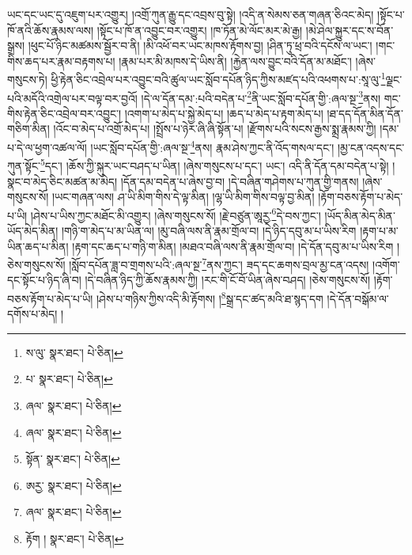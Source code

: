 ཡང་དང་ཡང་དུ་འཇུག་པར་འགྱུར། །འགྲོ་ཀུན་རྒྱུ་དང་འབྲས་བུ་སྟེ། །འདི་ན་སེམས་ཅན་གཞན་ཅིའང་མེད། །སྟོང་པ་ཁོ་ནའི་ཆོས་རྣམས་ལས། །སྟོང་པ་ཁོ་ན་འབྱུང་བར་འགྱུར། །ཁ་ཏོན་མེ་ལོང་མར་མེ་རྒྱ། །མེ་ཤེལ་སྐྱུར་དང་ས་བོན་སྒྲས། །ཕུང་པོ་ཉིང་མཚམས་སྦྱོར་བ་ནི། །མི་འཕོ་བར་ཡང་མཁས་རྟོགས་བྱ། །ཤིན་ཏུ་ཕྲ་བའི་དངོས་ལ་ཡང་། །གང་གིས་ཆད་པར་རྣམ་བརྟགས་པ། །རྣམ་པར་མི་མཁས་དེ་ཡིས་ནི། །རྐྱེན་ལས་བྱུང་བའི་དོན་མ་མཐོང་། །ཞེས་གསུངས་ཏེ། ཕྱི་རྟེན་ཅིང་འབྲེལ་པར་འབྱུང་བའི་ཚུལ་ཡང་སློབ་དཔོན་ཉིད་ཀྱིས་མཛད་པའི་འཕགས་པ་:སཱ་ལུ་\footnote{ས་ལུ་  སྣར་ཐང་།  པེ་ཅིན། }ལྗང་པའི་མདོའི་འགྲེལ་པར་བལྟ་བར་བྱའོ། །དེ་ལ་དོན་དམ་:པའི་བདེན་པ་\footnote{པ་  སྣར་ཐང་།  པེ་ཅིན། }ནི་ཡང་སློབ་དཔོན་གྱི་:ཞལ་སྔ་\footnote{ཞལ་  སྣར་ཐང་།  པེ་ཅིན། }ནས། གང་གིས་རྟེན་ཅིང་འབྲེལ་བར་འབྱུང་། །འགག་པ་མེད་པ་སྐྱེ་མེད་པ། །ཆད་པ་མེད་པ་རྟག་མེད་པ། །ཐ་དད་དོན་མིན་དོན་གཅིག་མིན། །འོང་བ་མེད་པ་འགྲོ་མེད་པ། །སྤྲོས་པ་ཉེར་ཞི་ཞི་སྟོན་པ། །རྫོགས་པའི་སངས་རྒྱས་སྨྲ་རྣམས་ཀྱི། །དམ་པ་དེ་ལ་ཕྱག་འཚལ་ལོ། །ཡང་སློབ་དཔོན་གྱི་:ཞལ་སྔ་\footnote{ཞལ་  སྣར་ཐང་།  པེ་ཅིན། }ནས། རྣམ་ཤེས་ཀྱང་ནི་འོད་གསལ་དང་། །མྱ་ངན་འདས་དང་ཀུན་སྟོང་\footnote{སྟོན་  སྣར་ཐང་།  པེ་ཅིན། }དང་། །ཆོས་ཀྱི་སྐུར་ཡང་བཤད་པ་ཡིན། །ཞེས་གསུངས་པ་དང་། ཡང་། འདི་ནི་དོན་དམ་བདེན་པ་སྟེ། །སྣང་བ་མེད་ཅིང་མཚན་མ་མེད། །དོན་དམ་བདེན་པ་ཞེས་བྱ་བ། །དེ་བཞིན་གཤེགས་པ་ཀུན་གྱི་གནས། །ཞེས་གསུངས་སོ། །ཡང་གཞན་ལས། ཤ་ཡི་མིག་གིས་དེ་ལྟ་མིན། །ལྷ་ཡི་མིག་གིས་བལྟ་བྱ་མིན། །རྟོག་བཅས་རྟོག་པ་མེད་པ་ཡི། །ཤེས་པ་ཡིས་ཀྱང་མཐོང་མི་འགྱུར། །ཞེས་གསུངས་སོ། །རྗེ་བཙུན་ཨཱརྱ་\footnote{ཨརྱ་  སྣར་ཐང་།  པེ་ཅིན། }དེ་བས་ཀྱང་། །ཡོད་མིན་མེད་མིན་ཡོད་མེད་མིན། །གཉི་ག་མེད་པ་མ་ཡིན་ལ། །མུ་བཞི་ལས་ནི་རྣམ་གྲོལ་བ། །དེ་ཉིད་དབུ་མ་པ་ཡིས་རིག །རྟག་པ་མ་ཡིན་ཆད་པ་མིན། །རྟག་དང་ཆད་པ་གཉི་ག་མིན། །མཐའ་བཞི་ལས་ནི་རྣམ་གྲོལ་བ། །དེ་དོན་དབུ་མ་པ་ཡིས་རིག །ཅེས་གསུངས་སོ། །སློབ་དཔོན་ཟླ་བ་གྲགས་པའི་:ཞལ་སྔ་\footnote{ཞལ་  སྣར་ཐང་།  པེ་ཅིན། }ནས་ཀྱང་། ཟད་དང་ཆགས་བྲལ་མྱ་ངན་འདས། །འགོག་དང་སྟོང་པ་ཉིད་ཞི་བ། །དེ་བཞིན་ཉིད་ཀྱི་ཆོས་རྣམས་ཀྱི། །རང་གི་ངོ་བོ་ཡིན་ཞེས་བཤད། །ཅེས་གསུངས་སོ། །རྟོག་བཅས་རྟོག་པ་མེད་པ་ཡི། །ཤེས་པ་གཉིས་ཀྱིས་འདི་མི་རྟོགས། །\footnote{རྟོག །  སྣར་ཐང་།  པེ་ཅིན། }སྒྲ་དང་ཚད་མའི་ཐ་སྙད་དག །དེ་དོན་བསྒོམ་ལ་དགོས་པ་མེད། །
